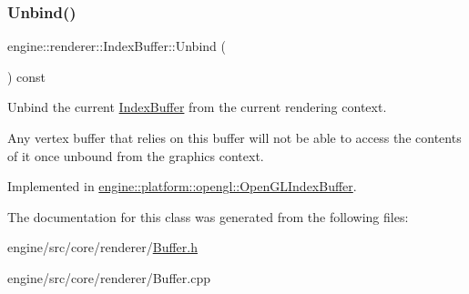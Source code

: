 \subsubsection{\texorpdfstring{Unbind()}{Unbind()}}
{\footnotesize\ttfamily engine\+::renderer\+::\+Index\+Buffer\+::\+Unbind (\begin{DoxyParamCaption}{ }\end{DoxyParamCaption}) const\hspace{0.3cm}{\ttfamily [pure virtual]}}



Unbind the current \hyperlink{classengine_1_1renderer_1_1IndexBuffer}{Index\+Buffer} from the current rendering context. 

Any vertex buffer that relies on this buffer will not be able to access the contents of it once unbound from the graphics context. 

Implemented in \hyperlink{classengine_1_1platform_1_1opengl_1_1OpenGLIndexBuffer_a9fc400e4c464a2dbf7df76eba359639e}{engine\+::platform\+::opengl\+::\+Open\+G\+L\+Index\+Buffer}.



The documentation for this class was generated from the following files\+:\begin{DoxyCompactItemize}
\item 
engine/src/core/renderer/\hyperlink{Buffer_8h}{Buffer.\+h}\item 
engine/src/core/renderer/Buffer.\+cpp\end{DoxyCompactItemize}
